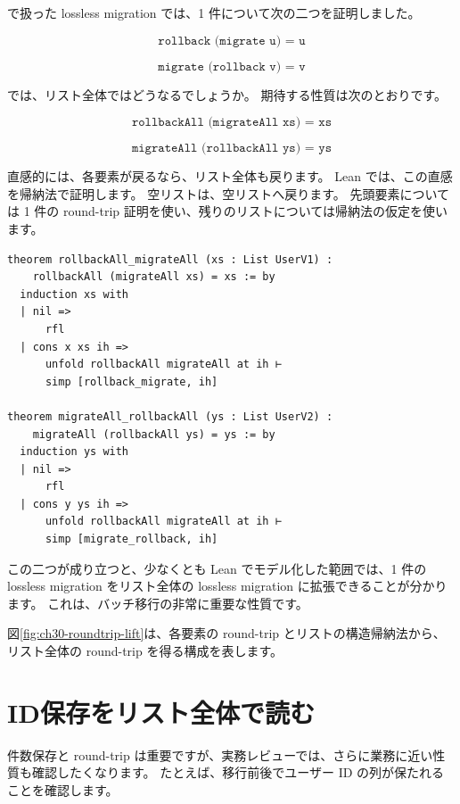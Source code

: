 で扱った lossless migration では、1 件について次の二つを証明しました。

\[
  \texttt{rollback (migrate u) = u}
\]

\[
  \texttt{migrate (rollback v) = v}
\]

では、リスト全体ではどうなるでしょうか。
期待する性質は次のとおりです。

\[
  \texttt{rollbackAll (migrateAll xs) = xs}
\]

\[
  \texttt{migrateAll (rollbackAll ys) = ys}
\]

直感的には、各要素が戻るなら、リスト全体も戻ります。
Lean では、この直感を帰納法で証明します。
空リストは、空リストへ戻ります。
先頭要素については 1 件の round-trip 証明を使い、残りのリストについては帰納法の仮定を使います。

\begin{listing}[htbp]
\begin{verbatim}
theorem rollbackAll_migrateAll (xs : List UserV1) :
    rollbackAll (migrateAll xs) = xs := by
  induction xs with
  | nil =>
      rfl
  | cons x xs ih =>
      unfold rollbackAll migrateAll at ih ⊢
      simp [rollback_migrate, ih]

theorem migrateAll_rollbackAll (ys : List UserV2) :
    migrateAll (rollbackAll ys) = ys := by
  induction ys with
  | nil =>
      rfl
  | cons y ys ih =>
      unfold rollbackAll migrateAll at ih ⊢
      simp [migrate_rollback, ih]
\end{verbatim}
\caption{\texttt{rollbackAll\_migrateAll} と \texttt{migrateAll\_rollbackAll}}
\label{lst:ch30-list-roundtrip}
\end{listing}

この二つが成り立つと、少なくとも Lean でモデル化した範囲では、1 件の lossless migration をリスト全体の lossless migration に拡張できることが分かります。
これは、バッチ移行の非常に重要な性質です。

図\ref{fig:ch30-roundtrip-lift}は、各要素の round-trip とリストの構造帰納法から、リスト全体の round-trip を得る構成を表します。


\section{ID保存をリスト全体で読む}

件数保存と round-trip は重要ですが、実務レビューでは、さらに業務に近い性質も確認したくなります。
たとえば、移行前後でユーザー ID の列が保たれることを確認します。

